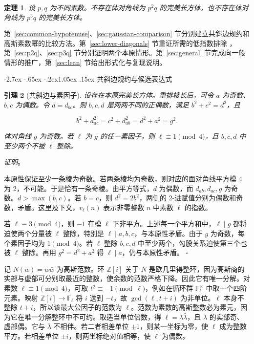 \documentclass[11pt,a4paper,twoside]{article}
\makeatletter
\numberwithin{equation}{section}
\newcommand{\proseheadingstop}{。}
\newtheorem{theorem}{定理}[section]
\newtheorem{lemma}[theorem]{引理}
\providecommand{\proofname}{证明}
\renewcommand{\section}{\@startsection{section}{1}{\z@}%
  {-2.7ex \@plus -.65ex \@minus -.2ex}{1.05ex \@plus .15ex}%
  {\normalfont\large\bfseries}}
\newenvironment{proof}[1][\proofname]{%
  \par\addvspace{.65\baselineskip}\noindent
  \textit{#1}\proseheadingstop\enspace\ignorespaces
}{%
  \unskip\nobreak\hfill\nobreak\(\square\)\par
  \addvspace{.65\baselineskip}
}
\makeatother
\begin{document}
\begin{theorem}\label{thm:main}
设 \(p,q\) 为不同素数。不存在体对角线为 \(p^2q\) 的完美长方体，也不存在体对角线为 \(p^3q\) 的完美长方体。
\end{theorem}

第~\ref{sec:common-hypotenuse}、\ref{sec:gaussian-comparison} 节分别建立共斜边规约和高斯素数幂的比较方法。第~\ref{sec:lower-diagonals} 节重证所需的低指数排除 \cite{ref1}，第~\ref{sec:p2q}、\ref{sec:p3q} 节分别证明两个本原情形。第~\ref{sec:general} 节完成向一般情形的推广，第~\ref{sec:lean} 节给出形式化与复现说明。

\section{共斜边规约与候选表达式}
\label{sec:common-hypotenuse}

\begin{lemma}[共斜边与素因子]\label{lem:common-hypotenuse}
设存在本原完美长方体。重排棱长后，可令 \(a\) 为奇数、\(b,c\) 为偶数。令 \(d=d_{bc}\)。则 \(b,c,d\) 是两两不同的正偶数，满足 \(b^2+c^2=d^2\)，且

\[
b^2+d_{ac}^2=c^2+d_{ab}^2=d^2+a^2=g^2.
\]

体对角线 \(g\) 为奇数。若 \(\ell\) 为 \(g\) 的任一素因子，则 \(\ell\equiv1\pmod4\)，且 \(b,c,d\) 中至少两个不被 \(\ell\) 整除。

\end{lemma}

\begin{proof}
本原性保证至少一条棱为奇数。若两条棱均为奇数，则对应的面对角线平方模 \(4\) 为 \(2\)，不可能。于是恰有一条奇棱。由平方等式，\(d\) 为偶数，而 \(d_{ab},d_{ac},g\) 为奇数。\(d>\max(b,c)\)。若 \(b=c\)，则 \(d^2=2b^2\)，两侧的 \(2\)-进赋值分别为偶数和奇数，矛盾。这里及下文，\(v_\ell(n)\) 表示非零整数 \(n\) 中素数 \(\ell\) 的指数。

若 \(\ell\equiv3\pmod4\)，则 \(-1\) 在模 \(\ell\) 下非平方。上述每一个平方和中，\(\ell\mid g\) 都将迫使两个分量被 \(\ell\) 整除，特别是 \(\ell\mid a,b,c\)，与本原性矛盾。由于 \(g\) 为奇数，每个素因子均为 \(1\pmod4\)。若 \(\ell\) 整除 \(b,c,d\) 中至少两个，勾股关系迫使第三个也被 \(\ell\) 整除。再用 \(g^2=d^2+a^2\) 得 \(\ell\mid a\)，仍与本原性矛盾。
\end{proof}

记 \(N(w)=w\bar w\) 为高斯范数。环 \(\mathbb Z[i]\) 关于 \(N\) 是欧几里得整环，因为高斯商的实部与虚部可分别取最近的整数，使余数的范数严格下降。因此它有唯一分解。对素数 \(\ell\equiv1\pmod4\)，可取 \(t^2\equiv-1\pmod\ell\)，例如在循环群 \(\mathbb F_\ell^\times\) 中取一个四阶元素。映射 \(\mathbb Z[i]\to\mathbb F_\ell\) 将 \(i\) 送到 \(-t\)，故 \(\gcd(\ell,t+i)\) 为非单位。\(\ell\) 本身不整除 \(t+i\)，所以该最大公因子的范数为 \(\ell\)。范数为素数的高斯整数必为素元，因为它在唯一分解整环中不可约。取适当单位倍数，得 \(\ell=\lambda\bar\lambda\)，且 \(\lambda\) 的实部奇、虚部偶。它与 \(\bar\lambda\) 不相伴。若二者相差单位 \(\pm1\)，则某一坐标为零，使 \(\ell\) 成为整数平方。若相差单位 \(\pm i\)，则两坐标绝对值相等，使 \(\ell\) 为偶数。
\end{document}
